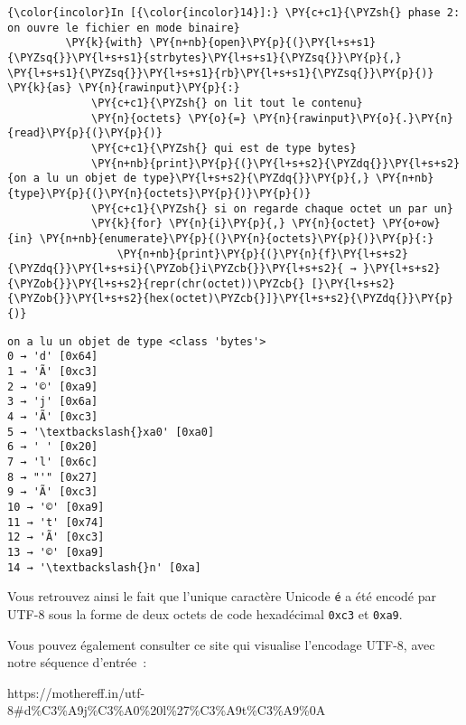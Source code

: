     \begin{Verbatim}[commandchars=\\\{\}]
{\color{incolor}In [{\color{incolor}14}]:} \PY{c+c1}{\PYZsh{} phase 2: on ouvre le fichier en mode binaire}
         \PY{k}{with} \PY{n+nb}{open}\PY{p}{(}\PY{l+s+s1}{\PYZsq{}}\PY{l+s+s1}{strbytes}\PY{l+s+s1}{\PYZsq{}}\PY{p}{,} \PY{l+s+s1}{\PYZsq{}}\PY{l+s+s1}{rb}\PY{l+s+s1}{\PYZsq{}}\PY{p}{)} \PY{k}{as} \PY{n}{rawinput}\PY{p}{:}
             \PY{c+c1}{\PYZsh{} on lit tout le contenu}
             \PY{n}{octets} \PY{o}{=} \PY{n}{rawinput}\PY{o}{.}\PY{n}{read}\PY{p}{(}\PY{p}{)}
             \PY{c+c1}{\PYZsh{} qui est de type bytes}
             \PY{n+nb}{print}\PY{p}{(}\PY{l+s+s2}{\PYZdq{}}\PY{l+s+s2}{on a lu un objet de type}\PY{l+s+s2}{\PYZdq{}}\PY{p}{,} \PY{n+nb}{type}\PY{p}{(}\PY{n}{octets}\PY{p}{)}\PY{p}{)}
             \PY{c+c1}{\PYZsh{} si on regarde chaque octet un par un}
             \PY{k}{for} \PY{n}{i}\PY{p}{,} \PY{n}{octet} \PY{o+ow}{in} \PY{n+nb}{enumerate}\PY{p}{(}\PY{n}{octets}\PY{p}{)}\PY{p}{:}
                 \PY{n+nb}{print}\PY{p}{(}\PY{n}{f}\PY{l+s+s2}{\PYZdq{}}\PY{l+s+si}{\PYZob{}i\PYZcb{}}\PY{l+s+s2}{ → }\PY{l+s+s2}{\PYZob{}}\PY{l+s+s2}{repr(chr(octet))\PYZcb{} [}\PY{l+s+s2}{\PYZob{}}\PY{l+s+s2}{hex(octet)\PYZcb{}]}\PY{l+s+s2}{\PYZdq{}}\PY{p}{)}
\end{Verbatim}


    \begin{Verbatim}[commandchars=\\\{\}]
on a lu un objet de type <class 'bytes'>
0 → 'd' [0x64]
1 → 'Ã' [0xc3]
2 → '©' [0xa9]
3 → 'j' [0x6a]
4 → 'Ã' [0xc3]
5 → '\textbackslash{}xa0' [0xa0]
6 → ' ' [0x20]
7 → 'l' [0x6c]
8 → "'" [0x27]
9 → 'Ã' [0xc3]
10 → '©' [0xa9]
11 → 't' [0x74]
12 → 'Ã' [0xc3]
13 → '©' [0xa9]
14 → '\textbackslash{}n' [0xa]

    \end{Verbatim}

    Vous retrouvez ainsi le fait que l'unique caractère Unicode \texttt{é} a
été encodé par UTF-8 sous la forme de deux octets de code hexadécimal
\texttt{0xc3} et \texttt{0xa9}.

    Vous pouvez également consulter ce site qui visualise l'encodage UTF-8,
avec notre séquence d'entrée~:

https://mothereff.in/utf-8\#d\%C3\%A9j\%C3\%A0\%20l\%27\%C3\%A9t\%C3\%A9\%0A

